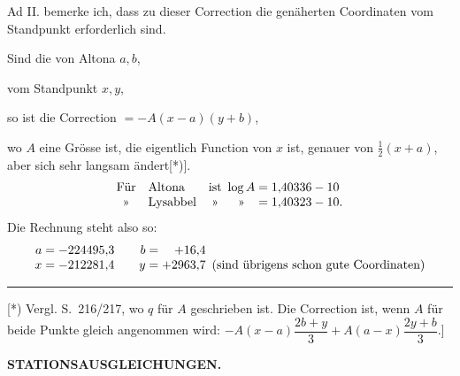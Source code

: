 Ad II. bemerke ich, dass zu dieser Correction die genäherten Coordinaten vom Standpunkt erforderlich sind.

Sind die von Altona \(a,b\),\par
vom Standpunkt \(x,y\),\par
so ist die Correction \(=-A(x-a)(y+b)\),\par
\noindent wo \(A\) eine Grösse ist, die eigentlich Function von \(x\) ist, genauer von \(\frac12(x+a)\), aber sich sehr langsam ändert[*)].
\[
\begin{array}{@{}c@{\quad}l@{\quad}c@{\enspace}c@{\;=\;}l@{}}
 \text{Für}&\text{Altona}&\text{ist}&\log A&1{,}40336-10\\
 \text{»}&\text{Lysabbel}&\text{»}&\text{»}&1{,}40323-10.
\end{array}
\]
\indent Die Rechnung steht also so:
\[
\begin{array}{@{}r@{\;=\;}r@{\qquad}r@{\;=\;}r@{\enspace}l@{}}
 a&-224495{,}3&b&+16{,}4&\\
 x&-212281{,}4&y&+2963{,}7&\text{(sind übrigens schon gute Coordinaten)}
\end{array}
\]

\par\smallskip\noindent\rule{4cm}{.4pt}\par
{\footnotesize\noindent\hspace*{\parindent}[*) Vergl. S.~216/217, wo \(q\) für \(A\) geschrieben ist. Die Correction ist, wenn \(A\) für beide Punkte gleich angenommen wird: \(-A(x-a)\dfrac{2b+y}{3}+A(a-x)\dfrac{2y+b}{3}\).]\par}

\par\clearpage
\noindent\null\hfill{\small\textbf{STATIONSAUSGLEICHUNGEN.}}\hfill{}\par\medskip

